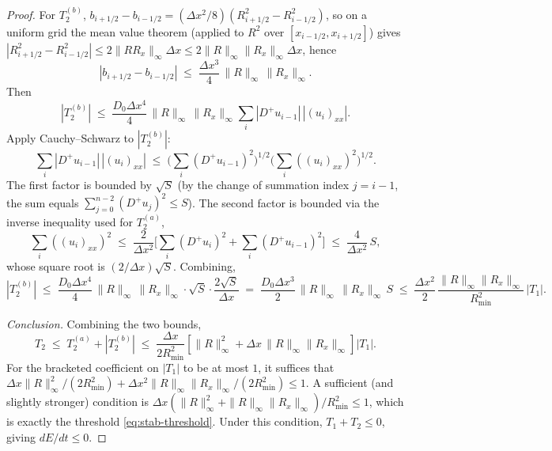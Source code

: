 \documentclass[11pt]{article}
\begin{document}
\begin{proof}
    For $T_2^{(b)}$, $b_{i+1/2} - b_{i-1/2} = (\Delta x^2/8)(R_{i+1/2}^2 - R_{i-1/2}^2)$, so on a uniform grid the mean value theorem (applied to $R^2$ over $[x_{i-1/2}, x_{i+1/2}]$) gives $|R_{i+1/2}^2 - R_{i-1/2}^2| \leq 2 \|R R_x\|_\infty \Delta x \leq 2\|R\|_\infty \|R_x\|_\infty \Delta x$, hence
    \begin{equation}
        |b_{i+1/2} - b_{i-1/2}| \;\leq\; \frac{\Delta x^3}{4}\, \|R\|_\infty\, \|R_x\|_\infty.
    \end{equation}
    Then
    \begin{equation}
        |T_2^{(b)}| \;\leq\; \frac{D_0 \Delta x^4}{4}\, \|R\|_\infty\, \|R_x\|_\infty \sum_i |D^+ u_{i-1}|\, |(u_i)_{xx}|.
    \end{equation}
    Apply Cauchy--Schwarz to $|T_2^{(b)}|$:
    \begin{equation}
        \sum_i |D^+ u_{i-1}|\, |(u_i)_{xx}| \;\leq\; \bigg(\sum_i (D^+ u_{i-1})^2\bigg)^{1/2} \bigg(\sum_i ((u_i)_{xx})^2\bigg)^{1/2}.
    \end{equation}
    The first factor is bounded by $\sqrt{S}$ (by the change of summation index $j = i-1$, the sum equals $\sum_{j=0}^{n-2}(D^+ u_j)^2 \leq S$). The second factor is bounded via the inverse inequality used for $T_2^{(a)}$,
    \begin{equation}
        \sum_i ((u_i)_{xx})^2 \;\leq\; \frac{2}{\Delta x^2} \bigg[\sum_i (D^+ u_i)^2 + \sum_i (D^+ u_{i-1})^2\bigg] \;\leq\; \frac{4}{\Delta x^2}\, S,
    \end{equation}
    whose square root is $(2/\Delta x)\sqrt{S}$. Combining,
    \begin{equation}
        |T_2^{(b)}| \;\leq\; \frac{D_0 \Delta x^4}{4}\, \|R\|_\infty\, \|R_x\|_\infty \cdot \sqrt{S} \cdot \frac{2\sqrt{S}}{\Delta x} \;=\; \frac{D_0 \Delta x^3}{2}\, \|R\|_\infty\, \|R_x\|_\infty\, S \;\leq\; \frac{\Delta x^2}{2}\, \frac{\|R\|_\infty \|R_x\|_\infty}{R_{\min}^2}\, |T_1|.
    \end{equation}

    \emph{Conclusion.} Combining the two bounds,
    \begin{equation}
        T_2 \;\leq\; T_2^{(a)} + |T_2^{(b)}| \;\leq\; \frac{\Delta x}{2 R_{\min}^2} \left[ \|R\|_\infty^2 + \Delta x\, \|R\|_\infty \|R_x\|_\infty \right] |T_1|.
    \end{equation}
    For the bracketed coefficient on $|T_1|$ to be at most $1$, it suffices that \newline $\Delta x \|R\|_\infty^2/(2 R_{\min}^2) + \Delta x^2 \|R\|_\infty \|R_x\|_\infty/(2 R_{\min}^2) \leq 1$. A sufficient (and slightly stronger) condition is $\Delta x (\|R\|_\infty^2 + \|R\|_\infty \|R_x\|_\infty)/R_{\min}^2 \leq 1$, which is exactly the threshold \eqref{eq:stab-threshold}. Under this condition, $T_1 + T_2 \leq 0$, giving $dE/dt \leq 0$.
\end{proof}
\end{document}
